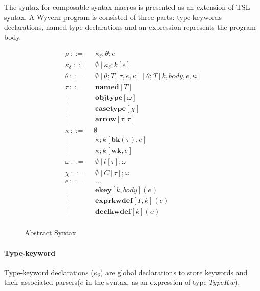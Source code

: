 \documentclass{sig-alternate}
\begin{document}
The syntax for composable syntax macros is presented as an extension of TSL syntax. A Wyvern program is consisted of three parts: type keywords declarations, named type declarations and an expression represents the program body. 

\begin{figure}[ht]
\begin{align*}
      \rho              ~::=&~ \kappa_{\delta};\theta;e\\
      \kappa_{\delta}   ~::=&~ \emptyset ~ | ~ \kappa_{\delta};k[e]\\
      \theta                  ~::=&~ \emptyset ~ | ~ \theta; T[\tau, e, \kappa] ~ | ~ \theta; T[k, body, e, \kappa]\\
      \tau              ~::=&~ \mathbf{named}[T]\\
                              |~    & ~ \mathbf{objtype}[\omega]\\
                              |~    & ~ \mathbf{casetype}[\chi]\\
                              |~  & ~ \mathbf{arrow}[\tau, \tau]\\
      \kappa                  ~::=& \emptyset\\       
                              |~  & ~ \kappa;k[\mathbf{bk}(\tau),e]\\
                              |~  & ~ \kappa;k[\mathbf{wk},e]\\
      \omega                  ~::=&~ \emptyset ~|~ l[\tau];\omega\\
      \chi              ~::=& ~\emptyset ~ | ~C[\tau];\omega\\
      e                       ~::=&~ ...\\
                              | ~ &~ \mathbf{ekey}[k,body](e)\\
                              | ~ &~ \mathbf{exprkwdef}[T,k](e)\\
                              | ~ &~ \mathbf{declkwdef}[k](e)\\
\end{align*}
\vspace{-8px}
\caption{Abstract Syntax}
\vspace{-10px}
\label{formal-syntax}
\end{figure}

\paragraph{Type-keyword}
Type-keyword declarations ($\kappa_{\delta}$) are global declarations to store keywords and their associated parsers($e$ in the syntax, as an expression of type $TypeKw$).  
\end{document}

